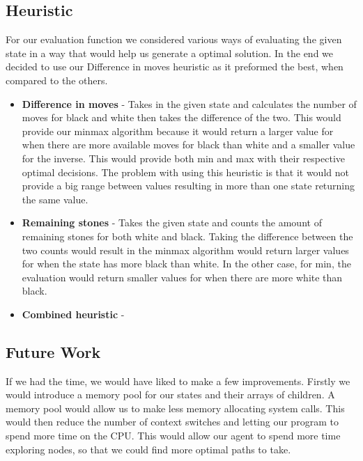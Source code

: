 \documentclass[12pt]{article}
\begin{document}

\subsection*{Heuristic}
For our evaluation function we considered various ways of evaluating the given state in a way that would help us generate a optimal solution.
In the end we decided to use our Difference in moves heuristic as it preformed the best, when compared to the others.

\begin{itemize}
\item \textbf{Difference in moves} -
Takes in the given state and calculates the number of moves for black and white then takes the difference of the two. 
This would provide our minmax algorithm because it would return a larger value for when there are more available moves for black than white and a smaller value for the inverse.
This would provide both min and max with their respective optimal decisions.
The problem with using this heuristic is that it would not provide a big range between values resulting in more than one state returning the same value.

\item \textbf{Remaining stones} -
Takes the given state and counts the amount of remaining stones for both white and black.
Taking the difference between the two counts would result in the minmax algorithm would return larger values for when the state has more black than white.
In the other case, for min, the evaluation would return smaller values for when there are more white than black.

\item \textbf{Combined heuristic} - 

\end{itemize}

\subsection*{Future Work}
If we had the time, we would have liked to make a few improvements.
Firstly we would introduce a memory pool for our states and their arrays of children.
A memory pool would allow us to make less memory allocating system calls.
This would then reduce the number of context switches and letting our program to spend more time on the CPU.
This would allow our agent to spend more time exploring nodes, so that we could find more optimal paths to take.
\end{document}

